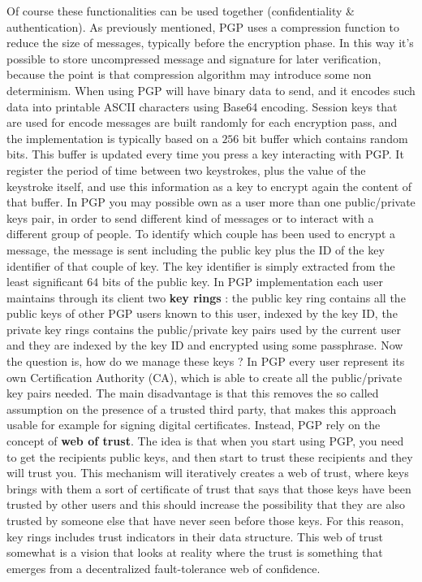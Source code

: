 Of course these functionalities can be used together (confidentiality \& authentication). As previously mentioned, PGP uses a compression function to reduce the size of messages, typically before the encryption phase. In this way it's possible to store uncompressed message and signature for later verification, because the point is that compression algorithm may introduce some non determinism. When using PGP will have binary data to send, and it encodes such data into printable ASCII characters using Base64 encoding. Session keys that are used for encode messages are built randomly for each encryption pass, and the implementation is typically based on a $256$ bit buffer which contains random bits. This buffer is updated every time you press a key interacting with PGP. It register the period of time between two keystrokes, plus the value of the keystroke itself, and use this information as a key to encrypt again the content of that buffer. In PGP you may possible own as a user more than one public/private keys pair, in order to send different kind of messages or to interact with a different group of people. To identify which couple has been used to encrypt a message, the message is sent including the public key plus the ID of the key identifier of that couple of key. The key identifier is simply extracted from the least significant $64$ bits of the public key. In PGP implementation each user maintains through its client two \textbf{key rings} : the public key ring contains all the public keys of other PGP users known to this user, indexed by the key ID, the private key rings contains the public/private key pairs used by the current user and they are indexed by the key ID and encrypted using some passphrase. Now the question is, how do we manage these keys ? In PGP every user represent its own Certification Authority (CA), which is able to create all the public/private key pairs needed. The main disadvantage is that this removes the so called assumption on the presence of a trusted third party, that makes this approach usable for example for signing digital certificates. Instead, PGP rely on the concept of \textbf{web of trust}. The idea is that when you start using PGP, you need to get the recipients public keys, and then start to trust these recipients and they will trust you. This mechanism will iteratively creates a web of trust, where keys brings with them a sort of certificate of trust that says that those keys have been trusted by other users and this should increase the possibility that they are also trusted by someone else that have never seen before those keys. For this reason, key rings includes trust indicators in their data structure. This web of trust somewhat is a vision that looks at reality where the trust is something that emerges from a decentralized fault-tolerance web of confidence.

